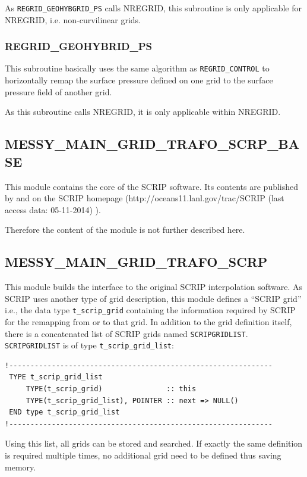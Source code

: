 \documentclass[11pt,twoside]{article}
\begin{document}
As \verb|REGRID_GEOHYBGRID_PS| calls NREGRID, this subroutine is only
applicable for NREGRID, i.e. non-curvilinear grids.
\subsubsection{REGRID\_GEOHYBRID\_PS\label{RGDGRIDPS}}
This subroutine basically uses the same algorithm as \verb|REGRID_CONTROL| to
horizontally remap the surface pressure defined on one grid to the surface
pressure field of another grid.

As this subroutine calls NREGRID, it is only applicable within
NREGRID.
\clearpage
\subsection{MESSY\_MAIN\_GRID\_TRAFO\_SCRP\_BASE\label{MMGTSB}}
This module contains the core of the SCRIP software. Its contents are
published by \cite{Jones99} and on the SCRIP homepage
(http://oceans11.lanl.gov/trac/SCRIP (last access data: 05-11-2014) ).

Therefore the content of the module is not further described here.
\clearpage
\subsection{MESSY\_MAIN\_GRID\_TRAFO\_SCRP\label{MMGTS}}
This module builds the interface to the original SCRIP interpolation
software. As SCRIP uses another type of grid description, this module
defines a ``SCRIP grid'' i.e., the data type \verb|t_scrip_grid|
containing the information required by SCRIP for the remapping
from or to that grid. In addition to the grid definition itself, there
is a concatenated list of SCRIP grids named \verb|SCRIPGRIDLIST|.
\verb|SCRIPGRIDLIST| is of type \verb|t_scrip_grid_list|:
\begin{verbatim}
!--------------------------------------------------------------
 TYPE t_scrip_grid_list
     TYPE(t_scrip_grid)               :: this
     TYPE(t_scrip_grid_list), POINTER :: next => NULL()
 END type t_scrip_grid_list
!--------------------------------------------------------------
\end{verbatim}
Using this list, all grids can be stored and searched. If
exactly the same definition is required multiple times, no additional grid 
need to be defined thus saving memory.
\end{document}
